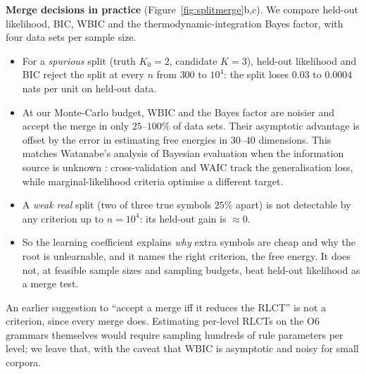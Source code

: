 \documentclass[11pt]{article}
\theoremstyle{definition}
\theoremstyle{remark}
\begin{document}
\textbf{Merge decisions in practice} (Figure~\ref{fig:splitmerge}b,c). We compare held-out likelihood, BIC, WBIC and the thermodynamic-integration Bayes factor, with four data sets per sample size.
\begin{itemize}
  \item For a \emph{spurious} split (truth $K_0=2$, candidate $K=3$), held-out likelihood and BIC reject the split at every $n$ from $300$ to $10^4$: the split loses $0.03$ to $0.0004$ nats per unit on held-out data.
  \item At our Monte-Carlo budget, WBIC and the Bayes factor are noisier and accept the merge in only $25$--$100\%$ of data sets. Their asymptotic advantage is offset by the error in estimating free energies in $30$--$40$ dimensions. This matches Watanabe's analysis of Bayesian evaluation when the information source is unknown \cite{watanabe22}: cross-validation and WAIC track the generalisation loss, while marginal-likelihood criteria optimise a different target.
  \item A \emph{weak real} split (two of three true symbols $25\%$ apart) is not detectable by any criterion up to $n=10^4$: its held-out gain is $\approx0$.
  \item So the learning coefficient explains \emph{why} extra symbols are cheap and why the root is unlearnable, and it names the right criterion, the free energy. It does not, at feasible sample sizes and sampling budgets, beat held-out likelihood as a merge test.
\end{itemize}
An earlier suggestion to ``accept a merge iff it reduces the RLCT'' is not a criterion, since every merge does. Estimating per-level RLCTs on the O6 grammars themselves would require sampling hundreds of rule parameters per level; we leave that, with the caveat that WBIC is asymptotic and noisy for small corpora.
\end{document}
